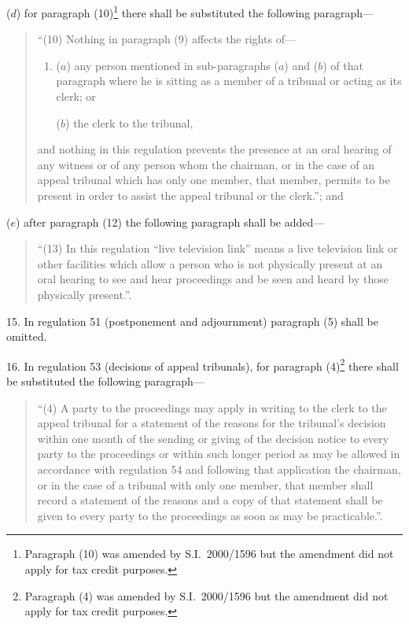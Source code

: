 \documentclass[12pt,a4paper]{article}
\begin{document}
\begin{enumerate}
($d$) for paragraph (10)\footnote{Paragraph (10) was amended by S.I.\ 2000/1596 but the amendment did not apply for tax credit purposes.} there shall be substituted the following paragraph—
\begin{quotation}
“(10) Nothing in paragraph (9) affects the rights of—
\begin{enumerate}\item[]
($a$) any person mentioned in sub-paragraphs ($a$)  and ($b$)  of that paragraph where he is sitting as a member of a tribunal or acting as its clerk; or

($b$) the clerk to the tribunal,
\end{enumerate}
and nothing in this regulation prevents the presence at an oral hearing of any witness or of any person whom the chairman, or in the case of an appeal tribunal which has only one member, that member, permits to be present in order to assist the appeal tribunal or the clerk.”; and
\end{quotation}

($e$) after paragraph (12) the following paragraph shall be added—
\begin{quotation}
“(13) In this regulation “live television link” means a live television link or other facilities which allow a person who is not physically present at an oral hearing to see and hear proceedings and be seen and heard by those physically present.”.
\end{quotation}
\end{enumerate}

\medskip

15.  In regulation 51 (postponement and adjournment) paragraph (5) shall be omitted.

\medskip

16.  In regulation 53 (decisions of appeal tribunals), for paragraph (4)\footnote{Paragraph (4) was amended by S.I.\ 2000/1596 but the amendment did not apply for tax credit purposes.} there shall be substituted the following paragraph—
\begin{quotation}
“(4) A party to the proceedings may apply in writing to the clerk to the appeal tribunal for a statement of the reasons for the tribunal’s decision within one month of the sending or giving of the decision notice to every party to the proceedings or within such longer period as may be allowed in accordance with regulation 54 and following that application the chairman, or in the case of a tribunal with only one member, that member shall record a statement of the reasons and a copy of that statement shall be given to every party to the proceedings as soon as may be practicable.”.
\end{quotation}
\end{document}
